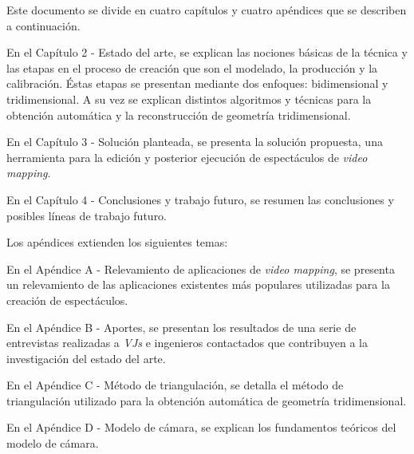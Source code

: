Este documento se divide en cuatro capítulos y cuatro apéndices que se describen a continuación.

En el Capítulo 2 - Estado del arte, se explican las nociones básicas de la técnica y las etapas en el proceso de creación que son el modelado, la producción y la calibración. Éstas etapas se presentan mediante dos enfoques: bidimensional y tridimensional. A su vez se explican distintos algoritmos y técnicas para la obtención automática y la reconstrucción de geometría tridimensional.

En el Capítulo 3 - Solución planteada, se presenta la solución propuesta, una herramienta para la edición y posterior ejecución de espectáculos de \emph{video mapping}.

En el Capítulo 4 - Conclusiones y trabajo futuro, se resumen las conclusiones y posibles líneas de trabajo futuro.

Los apéndices extienden los siguientes temas:

En el Apéndice A - Relevamiento de aplicaciones de \emph{video mapping}, se presenta un relevamiento de las aplicaciones existentes más populares utilizadas para la creación de espectáculos.

En el Apéndice B - Aportes, se presentan los resultados de una serie de entrevistas realizadas a \emph{VJs} e ingenieros contactados que contribuyen a la investigación del estado del arte.

En el Apéndice C - Método de triangulación, se detalla el método de triangulación utilizado para la obtención automática de geometría tridimensional.

En el Apéndice D - Modelo de cámara, se explican los fundamentos teóricos del modelo de cámara.
